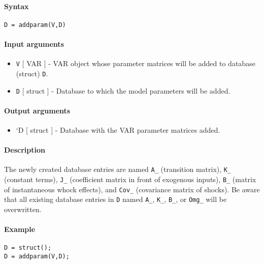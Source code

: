 


	\paragraph{Syntax}

\begin{verbatim}
D = addparam(V,D)
\end{verbatim}

\paragraph{Input arguments}

\begin{itemize}
\item
  \texttt{V} {[} VAR {]} - VAR object whose parameter matrices will be
  added to database (struct) \texttt{D}.
\item
  \texttt{D} {[} struct {]} - Database to which the model parameters
  will be added.
\end{itemize}

\paragraph{Output arguments}

\begin{itemize}
\itemsep1pt\parskip0pt
\item
  `D {[} struct {]} - Database with the VAR parameter matrices added.
\end{itemize}

\paragraph{Description}

The newly created database entries are named \texttt{A\_} (transition
matrix), \texttt{K\_} (constant terms), \texttt{J\_} (coefficient matrix
in front of exogenous inputs), \texttt{B\_} (matrix of instantaneous
whock effects), and \texttt{Cov\_} (covariance matrix of shocks). Be
aware that all existing database entries in \texttt{D} named
\texttt{A\_}, \texttt{K\_}, \texttt{B\_}, or \texttt{Omg\_} will be
overwritten.

\paragraph{Example}

\begin{verbatim}
D = struct();
D = addparam(V,D);
\end{verbatim}


